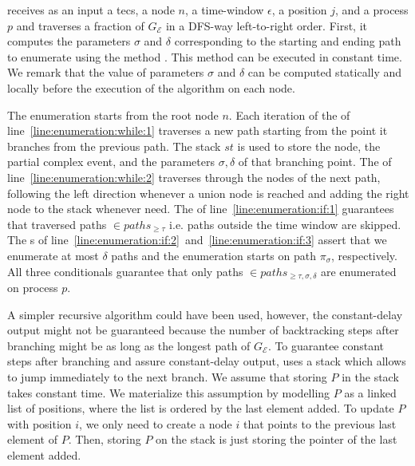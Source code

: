 {\color{Added}  receives as an input a \acrshort{tecs}, a node $n$, a time-window $\epsilon$, a position $j$, and a process $p$ and traverses a fraction of $G_{\mathcal{E}}$ in a DFS-way left-to-right order. First, it computes the parameters $\sigma$ and $\delta$ corresponding to the starting and ending path to enumerate using the method . This method can be executed in constant time. We remark that the value of parameters  $\sigma$ and $\delta$ can be computed statically and locally before the execution of the algorithm on each node.}

The enumeration starts from the root node $n$. Each iteration of the  of line~\ref{line:enumeration:while:1} traverses a new path starting from the point it branches from the previous path. The stack $st$ is used to store the node, the partial complex event, and the parameters $\sigma, \delta$ of that branching point. {\color{Added} The  of line~\ref{line:enumeration:while:2} traverses through the nodes of the next path, following the left direction whenever a union node is reached and adding the right node to the stack whenever need. The  of line~\ref{line:enumeration:if:1} guarantees that traversed paths $\in paths_{\ge \tau}$ i.e. paths outside the time window are skipped. The s of line~\ref{line:enumeration:if:2}~and~\ref{line:enumeration:if:3} assert that we enumerate at most $\delta$ paths and the enumeration starts on path $\pi_{\sigma}$, respectively. All three conditionals guarantee that only paths $\in paths_{\ge \tau, \sigma, \delta}$ are enumerated on process $p$.}

\begin{remark*}
A simpler recursive algorithm could have been used, however, the constant-delay output might not be guaranteed because the number of backtracking steps after branching might be as long as the longest path of $G_{\mathcal{E}}$. To guarantee constant steps after branching and assure constant-delay output,  uses a stack which allows to jump immediately to the next branch. We assume that storing $P$ in the stack takes constant time. We materialize this assumption by modelling $P$ as a linked list of positions, where the list is ordered by the last element added. To update $P$ with position $i$, we only need to create a node $i$ that points to the previous last element of $P$. Then, storing $P$ on the stack is just storing the pointer of the last element added.
\end{remark*}

